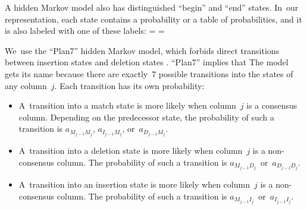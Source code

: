 \documentclass[preprint,nonatbib,blockstyle,times]{sigplanconf}
\newcommand\txprobj[3][]{a#1_{{#2}_{j-1}{#3}_j}}
\newcommand\txprobjj[3][]{a#1_{{#2}_{j-1}{#3}_j}}
\newif\ifverbatimsmall
\newcommand\smallverbatiminput[1]{%
  \verbatimsmalltrue
  \presvtopsep=\topsep
  \topsep=0.78\topsep
  \verbatimsmallfalse
  \topsep=\presvtopsep
}
\let\cite\citep
\begin{document}
A hidden Markov model also has distinguished ``begin'' and ``end''
states.
In~our representation, each state contains a probability or a table of
probabilities, and it is also labeled with one of these labels:
\smallverbatiminput{statelabel}


We~use the ``Plan7'' hidden Markov model, which forbids direct
transitions between insertion 
states and deletion states \cite{Eddy:1998ut}. 
\ifpagetuning
``Plan7'' implies that
\else
The model gets its name because
\fi
 there are exactly~7 possible transitions
into the states of any column~$j$.
Each transition has its own probability:
\begin{itemize} 
\item
A~transition into a match state 
is more likely when column~$j$ is a consensus column.
Depending on the predecessor state, 
the probability of such a transition is 
$\txprobj M M$, $\txprobj I M$, or~$\txprobj D M$.
\item
A~transition into a deletion state 
is more likely when column~$j$ is a non-consensus column.
The probability of such a transition is 
$\txprobj M D$~or~$\txprobj D D$.
\item
A~transition into an insertion state 
is more likely when column~$j$ is a non-consensus column.
The probability of such a transition is 
$\txprobjj M I$~or~$\txprobjj I I$.
\end{itemize}
\end{document}
